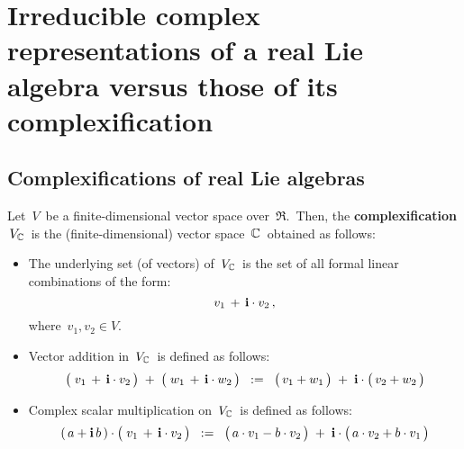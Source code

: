 

\chapter{Irreducible complex representations of a real Lie algebra versus those of its complexification}
\setcounter{theorem}{0}
\setcounter{equation}{0}


\renewcommand{\theenumi}{\roman{enumi}}
\renewcommand{\labelenumi}{\textnormal{(\theenumi)}$\;\;$}


\section{Complexifications of real Lie algebras}

\begin{definition}
\mbox{}
\vskip 0.05cm
\noindent
Let \,$V$\, be a finite-dimensional vector space over \,$\Re$.\,
Then, the \textbf{complexification} \,$V_{\mathbb{C}}$\, is
the (finite-dimensional) vector space \,$\mathbb{C}$\, obtained as follows:
\begin{itemize}
\item
	The underlying set (of vectors) of \,$V_{\mathbb{C}}$\, is the set of all formal linear combinations
	of the form:
	\begin{equation*}
	v_{1} \, + \, \textnormal{\bf i}\cdot v_{2}\,,
	\end{equation*}
	where \,$v_{1}, v_{2} \in V$.\,
\item
	Vector addition in \,$V_{\mathbb{C}}$\, is defined as follows:
	\begin{equation*}
	\left(\;\overset{{\color{white}.}}{v_{1}} \, + \, \i\cdot v_{2}\,\right)
	\; + \;
	\left(\;\overset{{\color{white}.}}{w_{1}} \, + \, \i\cdot w_{2}\,\right)
	\;\; := \;\;
		\left(\,\overset{{\color{white}.}}{v_{1}} + w_{1} \,\right)
		\; + \;
		\i\cdot\left(\,\overset{{\color{white}.}}{v_{2}} + w_{2} \,\right)
	\end{equation*}	
\item
	Complex scalar multiplication on \,$V_{\mathbb{C}}$\, is defined as follows:
	\begin{equation*}
	(\,a + \i \, b\,) \cdot \left(\;\overset{{\color{white}.}}{v_{1}} \, + \, \i\cdot v_{2}\,\right)
	\;\; := \;\;
		\left(\,a\cdot\overset{{\color{white}.}}{v_{1}} - b \cdot v_{2} \,\right)
		\; + \;
		\i\cdot\left(\,a\cdot\overset{{\color{white}.}}{v_{2}} + b \cdot v_{1} \,\right)
	\end{equation*}	
\end{itemize}
\end{definition}

